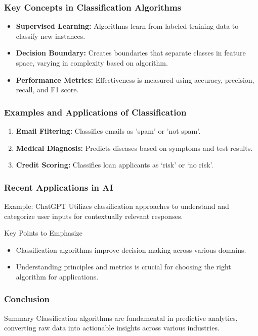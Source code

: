\documentclass[aspectratio=169]{beamer}
\begin{document}
\begin{frame}[fragile]
    \frametitle{Key Concepts in Classification Algorithms}
    \begin{itemize}
        \item \textbf{Supervised Learning:} Algorithms learn from labeled training data to classify new instances.
        \item \textbf{Decision Boundary:} Creates boundaries that separate classes in feature space, varying in complexity based on algorithm.
        \item \textbf{Performance Metrics:} Effectiveness is measured using accuracy, precision, recall, and F1 score.
    \end{itemize}
\end{frame}

\begin{frame}[fragile]
    \frametitle{Examples and Applications of Classification}
    \begin{enumerate}
        \item \textbf{Email Filtering:} Classifies emails as 'spam' or 'not spam'.
        \item \textbf{Medical Diagnosis:} Predicts diseases based on symptoms and test results.
        \item \textbf{Credit Scoring:} Classifies loan applicants as ‘risk’ or ‘no risk’.
    \end{enumerate}
\end{frame}

\begin{frame}[fragile]
    \frametitle{Recent Applications in AI}
    \begin{block}{Example: ChatGPT}
        Utilizes classification approaches to understand and categorize user inputs for contextually relevant responses.
    \end{block}
    \begin{block}{Key Points to Emphasize}
        \begin{itemize}
            \item Classification algorithms improve decision-making across various domains.
            \item Understanding principles and metrics is crucial for choosing the right algorithm for applications.
        \end{itemize}
    \end{block}
\end{frame}

\begin{frame}[fragile]
    \frametitle{Conclusion}
    \begin{block}{Summary}
        Classification algorithms are fundamental in predictive analytics, converting raw data into actionable insights across various industries.
    \end{block}
\end{frame}
\end{document}
